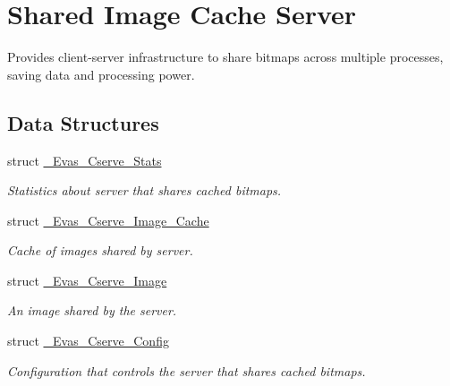 \section{Shared Image Cache Server}
\label{group__Evas__Cserve}


Provides client-\/server infrastructure to share bitmaps across multiple processes, saving data and processing power.  


\subsection*{Data Structures}
\begin{DoxyCompactItemize}
\item 
struct \hyperlink{struct__Evas__Cserve__Stats}{\_\-Evas\_\-Cserve\_\-Stats}
\begin{DoxyCompactList}\small\item\em Statistics about server that shares cached bitmaps. \item\end{DoxyCompactList}\item 
struct \hyperlink{struct__Evas__Cserve__Image__Cache}{\_\-Evas\_\-Cserve\_\-Image\_\-Cache}
\begin{DoxyCompactList}\small\item\em Cache of images shared by server. \item\end{DoxyCompactList}\item 
struct \hyperlink{struct__Evas__Cserve__Image}{\_\-Evas\_\-Cserve\_\-Image}
\begin{DoxyCompactList}\small\item\em An image shared by the server. \item\end{DoxyCompactList}\item 
struct \hyperlink{struct__Evas__Cserve__Config}{\_\-Evas\_\-Cserve\_\-Config}
\begin{DoxyCompactList}\small\item\em Configuration that controls the server that shares cached bitmaps. \item\end{DoxyCompactList}\end{DoxyCompactItemize}
